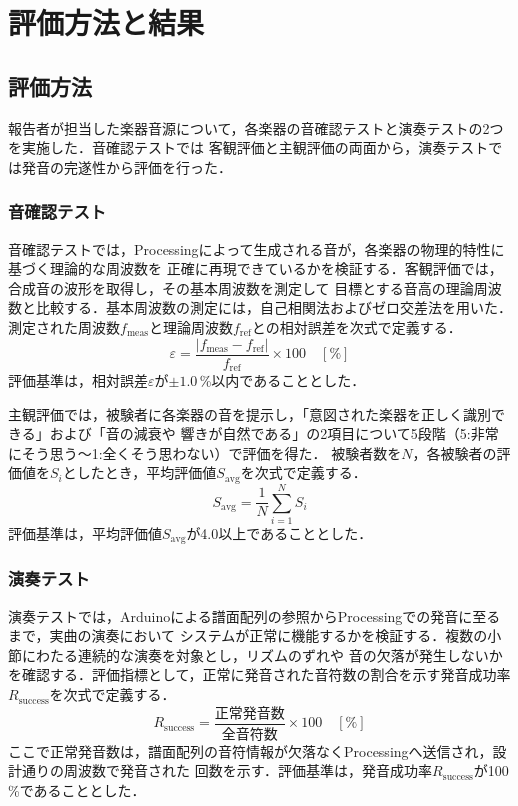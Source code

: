 \section{評価方法と結果}
\subsection{評価方法}
報告者が担当した楽器音源について，各楽器の音確認テストと演奏テストの2つを実施した．音確認テストでは
客観評価と主観評価の両面から，演奏テストでは発音の完遂性から評価を行った．

\subsubsection{音確認テスト}
音確認テストでは，Processingによって生成される音が，各楽器の物理的特性に基づく理論的な周波数を
正確に再現できているかを検証する．客観評価では，合成音の波形を取得し，その基本周波数を測定して
目標とする音高の理論周波数と比較する．基本周波数の測定には，自己相関法およびゼロ交差法を用いた．
測定された周波数$f_\mathrm{meas}$と理論周波数$f_\mathrm{ref}$との相対誤差を次式で定義する．
\begin{equation}
  \varepsilon = \frac{|f_\mathrm{meas} - f_\mathrm{ref}|}{f_\mathrm{ref}} \times 100 \quad [\%]
\end{equation}
評価基準は，相対誤差$\varepsilon$が$\pm1.0$\,\%以内であることとした．

主観評価では，被験者に各楽器の音を提示し，「意図された楽器を正しく識別できる」および「音の減衰や
響きが自然である」の2項目について5段階（5:非常にそう思う〜1:全くそう思わない）で評価を得た．
被験者数を$N$，各被験者の評価値を$S_i$としたとき，平均評価値$S_\mathrm{avg}$を次式で定義する．
\begin{equation}
  S_\mathrm{avg} = \frac{1}{N}\sum_{i=1}^{N} S_i
\end{equation}
評価基準は，平均評価値$S_\mathrm{avg}$が4.0以上であることとした．

\subsubsection{演奏テスト}
演奏テストでは，Arduinoによる譜面配列の参照からProcessingでの発音に至るまで，実曲の演奏において
システムが正常に機能するかを検証する．複数の小節にわたる連続的な演奏を対象とし，リズムのずれや
音の欠落が発生しないかを確認する．評価指標として，正常に発音された音符数の割合を示す発音成功率
$R_\mathrm{success}$を次式で定義する．
\begin{equation}
  R_\mathrm{success} = \frac{\text{正常発音数}}{\text{全音符数}} \times 100 \quad [\%]
\end{equation}
ここで正常発音数は，譜面配列の音符情報が欠落なくProcessingへ送信され，設計通りの周波数で発音された
回数を示す．評価基準は，発音成功率$R_\mathrm{success}$が100\,\%であることとした．

